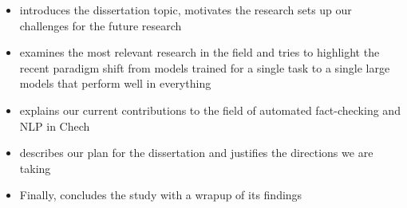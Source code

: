 \begin{itemize}
\item {} introduces the dissertation topic, motivates the research sets up our challenges for the future research 

\item {} examines the most relevant research in the field and tries to highlight the recent paradigm shift from models trained for a single task to a single large models that perform well in everything

\item {} explains our current contributions to the field of automated fact-checking and NLP in Chech

\item {} describes our plan for the dissertation and justifies the directions we are taking

\item Finally, {} concludes the study with a wrapup of its findings

\end{itemize}

